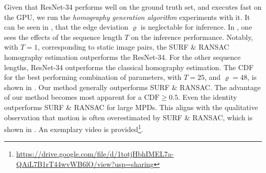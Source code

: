 Given that ResNet-34 performs well on the ground truth set, and executes fast on the GPU, we run the \textit{homography generation algorithm} experiments with it. It can be seen in , that the edge deviation $\varrho$ is neglectable for inference. In , one sees the effects of the sequence length $T$ on the inference performance. Notably, with $T=1$, corresponding to static image pairs, the SURF \& RANSAC homography estimation outperforms the ResNet-34. For the other sequence lengths, ResNet-34 outperforms the classical homography estimation. The CDF for the best performing combination of parameters, with $T=25$, and $\varrho=48$, is shown in . Our method generally outperforms SURF \& RANSAC. The advantage of our method becomes most apparent for a $\text{CDF}\geq0.5$. Even the identity outperforms SURF \& RANSAC for large MPDs. This aligns with the qualitative observation that motion is often overestimated by SURF \& RANSAC, which is shown in . An exemplary video is provided\footnote{\url{https://drive.google.com/file/d/1totjHbhIMEL7a-QAiL7B1rT44wvWB6lO/view?usp=sharing}}.







